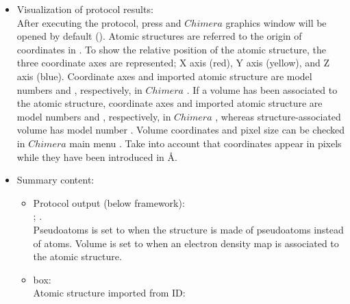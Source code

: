 \begin{itemize}
  \item Visualization of protocol results:\\
  
  After executing the protocol, press  and $Chimera$ graphics window will be opened by default (). 
  Atomic structures are referred to the origin of coordinates in \chimera. To show the relative position of the atomic structure, the three coordinate axes are represented; X axis (red), Y axis (yellow), and Z axis (blue). Coordinate axes and imported atomic structure are model numbers  and , respectively, in $Chimera$ . If a volume has been associated to the atomic structure, coordinate axes and imported atomic structure are model numbers  and , respectively, in $Chimera$ , whereas structure-associated volume has model number . Volume coordinates and pixel size can be checked in $Chimera$ main menu . Take into account that coordinates appear in pixels while they have been introduced in \AA.\\
   
   \item Summary content:\\
    \begin{itemize}
     \item Protocol output (below \scipion framework):\\ ; .\\Pseudoatoms is set to  when the structure is made of pseudoatoms instead of atoms. Volume is set to  when an electron density map is associated to the atomic structure.\\
     \item {} box:\\Atomic structure imported from ID: \\
    \end{itemize}

  \end{itemize}
